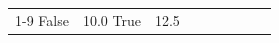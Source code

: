 \begin{table}[H]
\begin{tabular}{lllrlllll}
\cline{1-9}
False & 10.0%
\cline{1-9}
True & 12.5%

\end{tabular}
\end{table}

